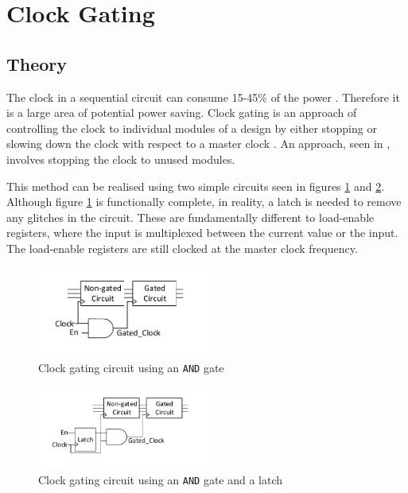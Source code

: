 
\section{Clock Gating}

\subsection{Theory}

The clock in a sequential circuit can consume 15-45\% of the power \cite{pedram1996power}.
Therefore it is a large area of potential power saving.
Clock gating is an approach of controlling the clock to individual modules of a design by either stopping or slowing down the clock with respect to a master clock \cite{841927}. 
An approach, seen in \cite{tellez1995activity}, involves stopping the clock to unused modules.

This method can be realised using two simple circuits seen in figures \ref{fig:cg:circuit1} and \ref{fig:cg:circuit2}.
Although figure \ref{fig:cg:circuit1} is functionally complete, in reality, a latch is needed to remove any glitches in the circuit.
These are fundamentally different to load-enable registers, where the input is multiplexed between the current value or the input.
The load-enable registers are still clocked at the master clock frequency.

\begin{figure}
\includegraphics[width=0.5\textwidth]{Figures/clockgating_and.pdf}
\caption{Clock gating circuit using an \texttt{AND} gate}
\label{fig:cg:circuit1}
\end{figure}

\begin{figure}
\includegraphics[width=0.5\textwidth]{Figures/clockgating_latch.pdf}
\caption{Clock gating circuit using an \texttt{AND} gate and a latch}
\label{fig:cg:circuit2}
\end{figure}

